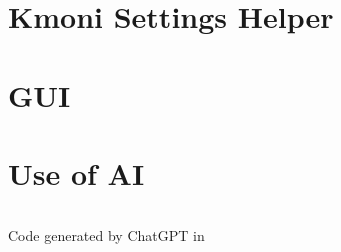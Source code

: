 \section{Kmoni Settings Helper}


\section{GUI}


\section{Use of AI}
\begin{normallisting}
    \inputminted{csharp}{code/websocket-demo.cs}
    \caption{Code generated by ChatGPT in \autocite{gpt-websocket}}
    \label{code-listing:gpt-websocket}
\end{normallisting}